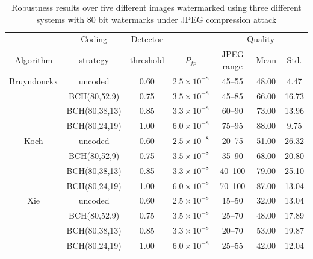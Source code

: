 \documentclass[12pt]{report}
\begin{document}
\begin{table}[htb]
\tiny
        \begin{center}
		\begin{tabular}{|c|c|c|c|c|c|c|} \hline
				& Coding		& Detector		& 		& \multicolumn{3}{c|}{Quality}	        \\ \cline{5-7}	
		Algorithm 	& strategy		& threshold		& $P_{fp}$ 	& JPEG range  	& Mean & Std. \\\hline\hline

		Bruyndonckx	& uncoded		& 0.60			& $2.5\times 10^{-8}$	& 45--55		& 48.00	& 4.47	\\ \cline{2-7}
				& BCH(80,52,9)		& 0.75			& $3.5\times 10^{-8}$	& 45--85		& 66.00	& 16.73	\\ \cline{2-7}
				& BCH(80,38,13)		& 0.85			& $3.3\times 10^{-8}$	& 60--90		& 73.00	& 13.96	\\ \cline{2-7}
				& BCH(80,24,19)		& 1.00			& $6.0\times 10^{-8}$	& 75--95		& 88.00	& 9.75	\\ \hline\hline

		Koch 		& uncoded		& 0.60			& $2.5\times 10^{-8}$	& 20--75		& 51.00	& 26.32	\\ \cline{2-7}
				& BCH(80,52,9)		& 0.75			& $3.5\times 10^{-8}$	& 35--90		& 68.00	& 20.80	\\ \cline{2-7}
				& BCH(80,38,13)   	& 0.85  		& $3.3\times 10^{-8}$	& 40--100	& 79.00	& 25.10	\\ \cline{2-7}	
				& BCH(80,24,19)		& 1.00			& $6.0\times 10^{-8}$	& 70--100	& 87.00	& 13.04	\\ \hline\hline	

		Xie		& uncoded               & 0.60			& $2.5\times 10^{-8}$	& 15--50		& 32.00	& 13.04	\\ \cline{2-7}
				& BCH(80,52,9)          & 0.75			& $3.5\times 10^{-8}$	& 25--70		& 48.00	& 17.89	\\ \cline{2-7} 	
				& BCH(80,38,13)         & 0.85 			& $3.3\times 10^{-8}$	& 20--70		& 53.00	& 19.87	\\ \cline{2-7} 
				& BCH(80,24,19)         & 1.00			& $6.0\times 10^{-8}$	& 25--55		& 42.00	& 12.04	\\ \hline 
	\end{tabular} 
	\caption{Robustness results over five different images watermarked using three different 
	systems with 80 bit watermarks under JPEG compression attack}
	\label{tab:80ResBKX}
	\end{center}
\end{table}
\normalsize
\end{document}
